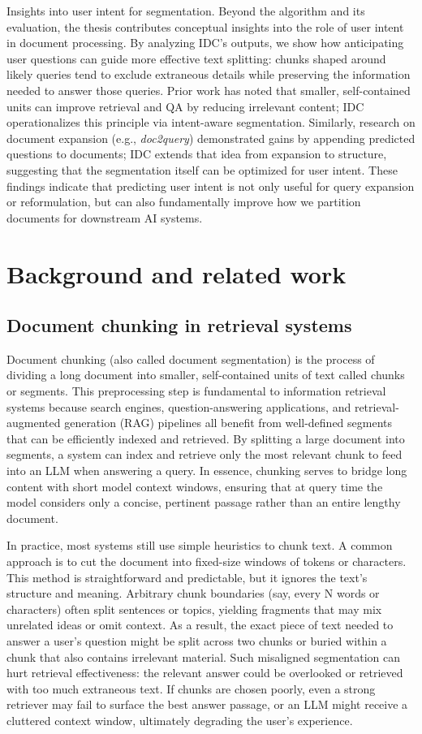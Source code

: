 \documentclass[12pt,a4paper]{report}
\begin{document}
Insights into user intent for segmentation. Beyond the algorithm and its evaluation, the thesis contributes conceptual insights into the role of user intent in document processing. By analyzing IDC's outputs, we show how anticipating user questions can guide more effective text splitting: chunks shaped around likely queries tend to exclude extraneous details while preserving the information needed to answer those queries. Prior work has noted that smaller, self-contained units can improve retrieval and QA by reducing irrelevant content; IDC operationalizes this principle via intent-aware segmentation. Similarly, research on document expansion (e.g., \textit{doc2query}) demonstrated gains by appending predicted questions to documents; IDC extends that idea from expansion to structure, suggesting that the segmentation itself can be optimized for user intent. These findings indicate that predicting user intent is not only useful for query expansion or reformulation, but can also fundamentally improve how we partition documents for downstream AI systems.

\chapter{Background and related work}

\section{Document chunking in retrieval systems}

Document chunking (also called document segmentation) is the process of dividing a long document into smaller, self-contained units of text called chunks or segments. This preprocessing step is fundamental to information retrieval systems because search engines, question-answering applications, and retrieval-augmented generation (RAG) pipelines all benefit from well-defined segments that can be efficiently indexed and retrieved. By splitting a large document into segments, a system can index and retrieve only the most relevant chunk to feed into an LLM when answering a query. In essence, chunking serves to bridge long content with short model context windows, ensuring that at query time the model considers only a concise, pertinent passage rather than an entire lengthy document.

In practice, most systems still use simple heuristics to chunk text. A common approach is to cut the document into fixed-size windows of tokens or characters. This method is straightforward and predictable, but it ignores the text's structure and meaning. Arbitrary chunk boundaries (say, every N words or characters) often split sentences or topics, yielding fragments that may mix unrelated ideas or omit context. As a result, the exact piece of text needed to answer a user's question might be split across two chunks or buried within a chunk that also contains irrelevant material. Such misaligned segmentation can hurt retrieval effectiveness: the relevant answer could be overlooked or retrieved with too much extraneous text. If chunks are chosen poorly, even a strong retriever may fail to surface the best answer passage, or an LLM might receive a cluttered context window, ultimately degrading the user's experience.
\end{document}
